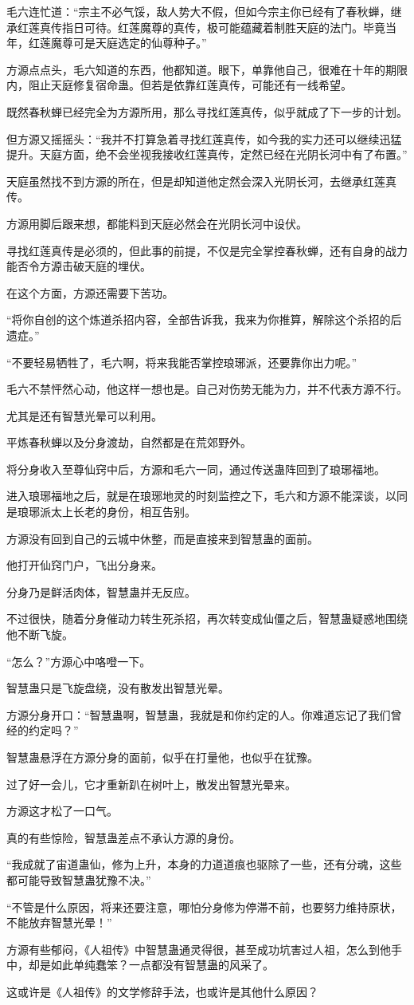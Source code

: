 \begin{this_body}
毛六连忙道：“宗主不必气馁，敌人势大不假，但如今宗主你已经有了春秋蝉，继承红莲真传指日可待。红莲魔尊的真传，极可能蕴藏着制胜天庭的法门。毕竟当年，红莲魔尊可是天庭选定的仙尊种子。”

方源点点头，毛六知道的东西，他都知道。眼下，单靠他自己，很难在十年的期限内，阻止天庭修复宿命蛊。但若是依靠红莲真传，可能还有一线希望。

既然春秋蝉已经完全为方源所用，那么寻找红莲真传，似乎就成了下一步的计划。

但方源又摇摇头：“我并不打算急着寻找红莲真传，如今我的实力还可以继续迅猛提升。天庭方面，绝不会坐视我接收红莲真传，定然已经在光阴长河中有了布置。”

天庭虽然找不到方源的所在，但是却知道他定然会深入光阴长河，去继承红莲真传。

方源用脚后跟来想，都能料到天庭必然会在光阴长河中设伏。

寻找红莲真传是必须的，但此事的前提，不仅是完全掌控春秋蝉，还有自身的战力能否令方源击破天庭的埋伏。

在这个方面，方源还需要下苦功。

“将你自创的这个炼道杀招内容，全部告诉我，我来为你推算，解除这个杀招的后遗症。”

“不要轻易牺牲了，毛六啊，将来我能否掌控琅琊派，还要靠你出力呢。”

毛六不禁怦然心动，他这样一想也是。自己对伤势无能为力，并不代表方源不行。

尤其是还有智慧光晕可以利用。

平炼春秋蝉以及分身渡劫，自然都是在荒郊野外。

将分身收入至尊仙窍中后，方源和毛六一同，通过传送蛊阵回到了琅琊福地。

进入琅琊福地之后，就是在琅琊地灵的时刻监控之下，毛六和方源不能深谈，以同是琅琊派太上长老的身份，相互告别。

方源没有回到自己的云城中休整，而是直接来到智慧蛊的面前。

他打开仙窍门户，飞出分身来。

分身乃是鲜活肉体，智慧蛊并无反应。

不过很快，随着分身催动力转生死杀招，再次转变成仙僵之后，智慧蛊疑惑地围绕他不断飞旋。

“怎么？”方源心中咯噔一下。

智慧蛊只是飞旋盘绕，没有散发出智慧光晕。

方源分身开口：“智慧蛊啊，智慧蛊，我就是和你约定的人。你难道忘记了我们曾经的约定吗？”

智慧蛊悬浮在方源分身的面前，似乎在打量他，也似乎在犹豫。

过了好一会儿，它才重新趴在树叶上，散发出智慧光晕来。

方源这才松了一口气。

真的有些惊险，智慧蛊差点不承认方源的身份。

“我成就了宙道蛊仙，修为上升，本身的力道道痕也驱除了一些，还有分魂，这些都可能导致智慧蛊犹豫不决。”

“不管是什么原因，将来还要注意，哪怕分身修为停滞不前，也要努力维持原状，不能放弃智慧光晕！”

方源有些郁闷，《人祖传》中智慧蛊通灵得很，甚至成功坑害过人祖，怎么到他手中，却是如此单纯蠢笨？一点都没有智慧蛊的风采了。

这或许是《人祖传》的文学修辞手法，也或许是其他什么原因？

\end{this_body}

